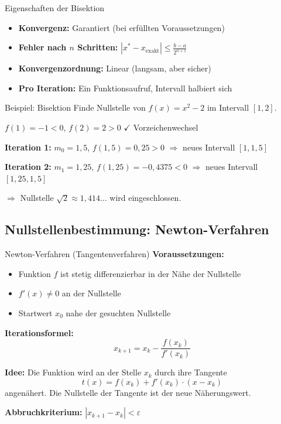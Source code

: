 \documentclass[a4paper,fontsize = 7pt]{scrartcl}
\begin{document}
\begin{subbox}{Eigenschaften der Bisektion}
\begin{itemize}
	\item \textbf{Konvergenz:} Garantiert (bei erfüllten Voraussetzungen)
	\item \textbf{Fehler nach $n$ Schritten:} $|x^* - x_{\text{exakt}}| \leq \frac{b-a}{2^{n+1}}$
	\item \textbf{Konvergenzordnung:} Linear (langsam, aber sicher)
	\item \textbf{Pro Iteration:} Ein Funktionsaufruf, Intervall halbiert sich
\end{itemize}
\end{subbox}

\begin{subbox}{Beispiel: Bisektion}
Finde Nullstelle von $f(x) = x^2 - 2$ im Intervall $[1, 2]$.

$f(1) = -1 < 0$, $f(2) = 2 > 0$ $\checkmark$ Vorzeichenwechsel

\textbf{Iteration 1:} $m_0 = 1{,}5$, $f(1{,}5) = 0{,}25 > 0$
$\Rightarrow$ neues Intervall $[1, 1{,}5]$

\textbf{Iteration 2:} $m_1 = 1{,}25$, $f(1{,}25) = -0{,}4375 < 0$
$\Rightarrow$ neues Intervall $[1{,}25, 1{,}5]$

$\Rightarrow$ Nullstelle $\sqrt{2} \approx 1{,}414...$ wird eingeschlossen.
\end{subbox}

\subsection{Nullstellenbestimmung: Newton-Verfahren}

\begin{mainbox}{Newton-Verfahren (Tangentenverfahren)}
\textbf{Voraussetzungen:}
\begin{itemize}
	\item Funktion $f$ ist stetig differenzierbar in der Nähe der Nullstelle
	\item $f'(x) \neq 0$ an der Nullstelle
	\item Startwert $x_0$ nahe der gesuchten Nullstelle
\end{itemize}

\textbf{Iterationsformel:}
$$\boxed{x_{k+1} = x_k - \frac{f(x_k)}{f'(x_k)}}$$

\textbf{Idee:} Die Funktion wird an der Stelle $x_k$ durch ihre Tangente
$$t(x) = f(x_k) + f'(x_k) \cdot (x - x_k)$$
angenähert. Die Nullstelle der Tangente ist der neue Näherungswert.

\textbf{Abbruchkriterium:} $|x_{k+1} - x_k| < \varepsilon$
\end{mainbox}
\end{document}
